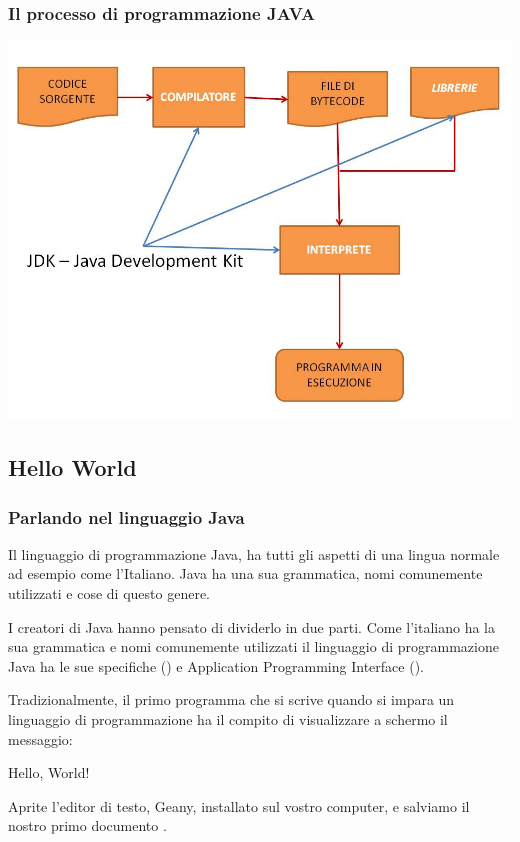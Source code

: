 \begin{frame}
\frametitle{Il processo di programmazione JAVA}
\begin{center}
\includegraphics[scale=0.4]{images/processo.jpg}
\end{center}
\end{frame}

\subsection{Hello World}
\begin{frame}
\frametitle{Parlando nel linguaggio Java}
\begin{block}{}
Il linguaggio di programmazione Java, ha tutti gli aspetti di una lingua normale ad esempio come l'Italiano. Java
ha una sua grammatica, nomi comunemente utilizzati e cose di questo genere.
\end{block}
\begin{block}{}
I creatori di Java hanno pensato di dividerlo in due parti. Come l'italiano ha la sua grammatica e nomi comunemente utilizzati
il linguaggio di programmazione Java ha le sue specifiche () e Application Programming Interface
().
\end{block}

\end{frame}
\begin{frame}
\begin{block}{}
Tradizionalmente, il primo programma che si scrive quando si impara un linguaggio di programmazione ha il compito di 
visualizzare a schermo il messaggio:
\begin{center}
\large{\alert{Hello, World!}}
\end{center}
\end{block}
\begin{block}{}
Aprite l'editor di testo, Geany, installato sul vostro computer, e salviamo il nostro primo documento
.
\end{block}
\end{frame}

